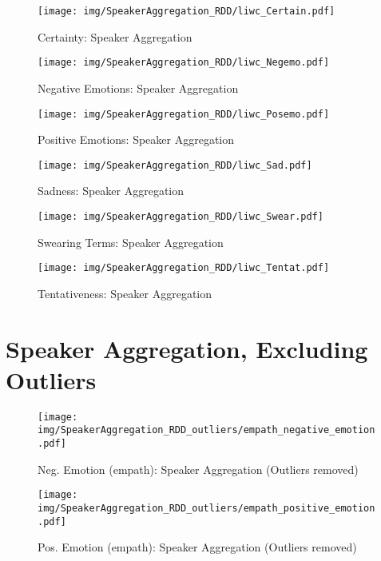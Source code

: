 \begin{figure}[h]\centering
\texttt{[image: img/SpeakerAggregation\_RDD/liwc\_Certain.pdf]}
\caption{Certainty: Speaker Aggregation}
\label{fig: sa_Certainty}
\end{figure}

\begin{figure}[h]\centering
\texttt{[image: img/SpeakerAggregation\_RDD/liwc\_Negemo.pdf]}
\caption{Negative Emotions: Speaker Aggregation}
\label{fig: sa_Negative Emotions}
\end{figure}

\begin{figure}[h]\centering
\texttt{[image: img/SpeakerAggregation\_RDD/liwc\_Posemo.pdf]}
\caption{Positive Emotions: Speaker Aggregation}
\label{fig: sa_Positive Emotions}
\end{figure}

\begin{figure}[h]\centering
\texttt{[image: img/SpeakerAggregation\_RDD/liwc\_Sad.pdf]}
\caption{Sadness: Speaker Aggregation}
\label{fig: sa_Sadness}
\end{figure}

\begin{figure}[h]\centering
\texttt{[image: img/SpeakerAggregation\_RDD/liwc\_Swear.pdf]}
\caption{Swearing Terms: Speaker Aggregation}
\label{fig: sa_Swearing Terms}
\end{figure}

\begin{figure}[h]\centering
\texttt{[image: img/SpeakerAggregation\_RDD/liwc\_Tentat.pdf]}
\caption{Tentativeness: Speaker Aggregation}
\label{fig: sa_Tentativeness}
\end{figure}

\clearpage
\pagebreak

\section{Speaker Aggregation, Excluding Outliers}

\begin{figure}[h]\centering
\texttt{[image: img/SpeakerAggregation\_RDD\_outliers/empath\_negative\_emotion.pdf]}
\caption{Neg. Emotion (empath): Speaker Aggregation (Outliers removed)}
\label{fig: sa_Neg. Emotion (empath)}
\end{figure}

\begin{figure}[h]\centering
\texttt{[image: img/SpeakerAggregation\_RDD\_outliers/empath\_positive\_emotion.pdf]}
\caption{Pos. Emotion (empath): Speaker Aggregation (Outliers removed)}
\label{fig: sa_Pos. Emotion (empath)}
\end{figure}

